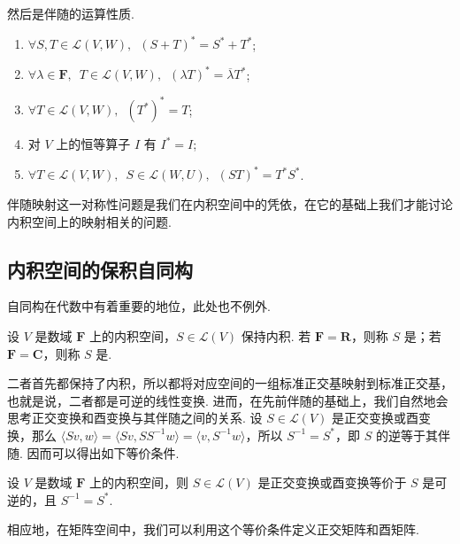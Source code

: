 然后是伴随的运算性质.

\begin{enumerate}
    \item $ \forall S, T \in \mathcal{L}(V, W),\enspace (S + T)^* = S^* + T^* $;

    \item $ \forall \lambda \in \mathbf{F},\enspace T \in \mathcal{L}(V, W),\enspace (\lambda T)^* = \overline{\lambda} T^* $;

    \item $ \forall T \in \mathcal{L}(V, W),\enspace (T^*)^* = T $;

    \item 对 $ V $ 上的恒等算子 $ I $ 有 $ I^* = I $;

    \item $ \forall T \in \mathcal{L}(V, W),\enspace S \in \mathcal{L}(W, U),\enspace (ST)^* = T^*S^* $.
\end{enumerate}

伴随映射这一对称性问题是我们在内积空间中的凭依，在它的基础上我们才能讨论内积空间上的映射相关的问题.

\subsection{内积空间的保积自同构}

自同构在代数中有着重要的地位，此处也不例外.

\begin{definition}{}{}
    设 $ V $ 是数域 $ \mathbf{F} $ 上的内积空间，$ S \in \mathcal{L}(V) $ 保持内积. 若 $ \mathbf{F} = \mathbf{R} $，则称 $ S $ 是；若 $ \mathbf{F} = \mathbf{C} $，则称 $ S $ 是.
\end{definition}

二者首先都保持了内积，所以都将对应空间的一组标准正交基映射到标准正交基，也就是说，二者都是可逆的线性变换. 进而，在先前伴随的基础上，我们自然地会思考正交变换和酉变换与其伴随之间的关系. 设 $ S \in \mathcal{L}(V) $ 是正交变换或酉变换，那么 $ \langle Sv, w \rangle = \langle Sv, SS^{-1} w \rangle = \langle v, S^{-1}w \rangle $，所以 $ S^{-1} = S^* $，即 $ S $ 的逆等于其伴随. 因而可以得出如下等价条件.

\begin{theorem}{}{}
    设 $ V $ 是数域 $ \mathbf{F} $ 上的内积空间，则 $ S \in \mathcal{L}(V) $ 是正交变换或酉变换等价于 $ S $ 是可逆的，且 $ S^{-1} = S^* $.
\end{theorem}

相应地，在矩阵空间中，我们可以利用这个等价条件定义正交矩阵和酉矩阵.

